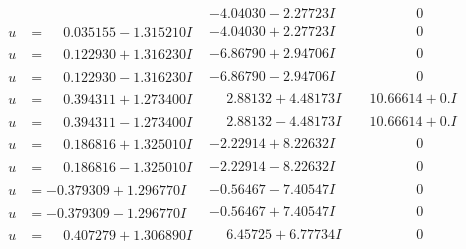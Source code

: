 \documentclass[1p]{elsarticle_modified}
\theoremstyle{definition}
\begin{document}
$$\begin{array}{c|c|c}
 & -4.04030 - 2.27723 I & \phantom{-0.000000 } 0 \\ \hline\begin{aligned}
u &= \phantom{-}0.035155 - 1.315210 I\end{aligned}
 & -4.04030 + 2.27723 I & \phantom{-0.000000 } 0 \\ \hline\begin{aligned}
u &= \phantom{-}0.122930 + 1.316230 I\end{aligned}
 & -6.86790 + 2.94706 I & \phantom{-0.000000 } 0 \\ \hline\begin{aligned}
u &= \phantom{-}0.122930 - 1.316230 I\end{aligned}
 & -6.86790 - 2.94706 I & \phantom{-0.000000 } 0 \\ \hline\begin{aligned}
u &= \phantom{-}0.394311 + 1.273400 I\end{aligned}
 & \phantom{-}2.88132 + 4.48173 I & \phantom{-}10.66614 + 0. I\phantom{ +0.000000I} \\ \hline\begin{aligned}
u &= \phantom{-}0.394311 - 1.273400 I\end{aligned}
 & \phantom{-}2.88132 - 4.48173 I & \phantom{-}10.66614 + 0. I\phantom{ +0.000000I} \\ \hline\begin{aligned}
u &= \phantom{-}0.186816 + 1.325010 I\end{aligned}
 & -2.22914 + 8.22632 I & \phantom{-0.000000 } 0 \\ \hline\begin{aligned}
u &= \phantom{-}0.186816 - 1.325010 I\end{aligned}
 & -2.22914 - 8.22632 I & \phantom{-0.000000 } 0 \\ \hline\begin{aligned}
u &= -0.379309 + 1.296770 I\end{aligned}
 & -0.56467 - 7.40547 I & \phantom{-0.000000 } 0 \\ \hline\begin{aligned}
u &= -0.379309 - 1.296770 I\end{aligned}
 & -0.56467 + 7.40547 I & \phantom{-0.000000 } 0 \\ \hline\begin{aligned}
u &= \phantom{-}0.407279 + 1.306890 I\end{aligned}
 & \phantom{-}6.45725 + 6.77734 I & \phantom{-0.000000 } 0\\

\end{array}$$
\end{document}
